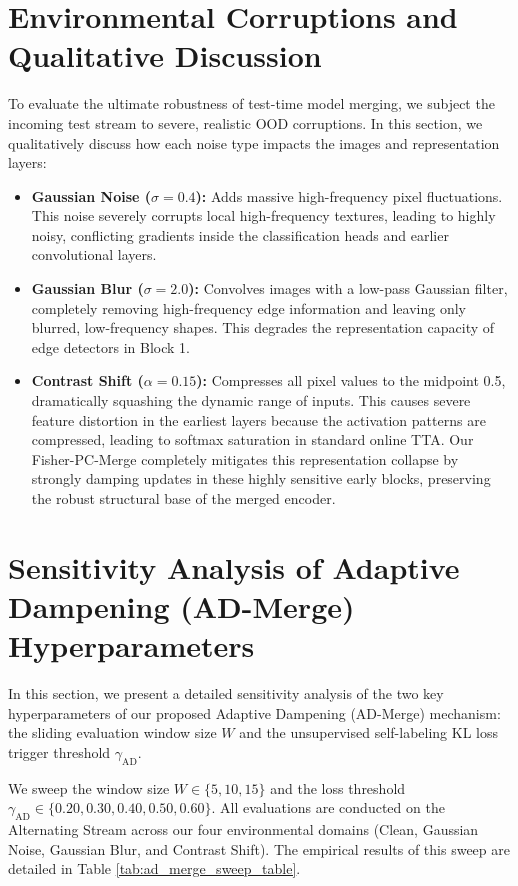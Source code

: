 \documentclass{article}
\theoremstyle{plain}
\theoremstyle{definition}
\theoremstyle{remark}
\begin{document}
\section{Environmental Corruptions and Qualitative Discussion}
\label{appendix:corruptions}
To evaluate the ultimate robustness of test-time model merging, we subject the incoming test stream to severe, realistic OOD corruptions. In this section, we qualitatively discuss how each noise type impacts the images and representation layers:
\begin{itemize}
    \item \textbf{Gaussian Noise (\(\sigma = 0.4\)):} Adds massive high-frequency pixel fluctuations. This noise severely corrupts local high-frequency textures, leading to highly noisy, conflicting gradients inside the classification heads and earlier convolutional layers.
    \item \textbf{Gaussian Blur (\(\sigma = 2.0\)):} Convolves images with a low-pass Gaussian filter, completely removing high-frequency edge information and leaving only blurred, low-frequency shapes. This degrades the representation capacity of edge detectors in Block 1.
    \item \textbf{Contrast Shift (\(\alpha = 0.15\)):} Compresses all pixel values to the midpoint 0.5, dramatically squashing the dynamic range of inputs. This causes severe feature distortion in the earliest layers because the activation patterns are compressed, leading to softmax saturation in standard online TTA. Our Fisher-PC-Merge completely mitigates this representation collapse by strongly damping updates in these highly sensitive early blocks, preserving the robust structural base of the merged encoder.
\end{itemize}

\section{Sensitivity Analysis of Adaptive Dampening (AD-Merge) Hyperparameters}
\label{appendix:ad_merge_sweep}
In this section, we present a detailed sensitivity analysis of the two key hyperparameters of our proposed Adaptive Dampening (AD-Merge) mechanism: the sliding evaluation window size $W$ and the unsupervised self-labeling KL loss trigger threshold $\gamma_{\text{AD}}$. 

We sweep the window size $W \in \{5, 10, 15\}$ and the loss threshold $\gamma_{\text{AD}} \in \{0.20, 0.30, 0.40, 0.50, 0.60\}$. All evaluations are conducted on the Alternating Stream across our four environmental domains (Clean, Gaussian Noise, Gaussian Blur, and Contrast Shift). The empirical results of this sweep are detailed in Table \ref{tab:ad_merge_sweep_table}.
\end{document}
